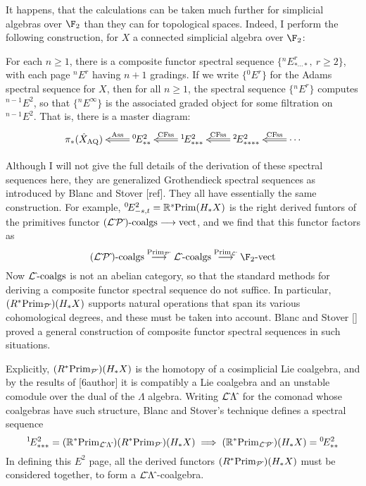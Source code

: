 \documentclass[11pt]{article}
\begin{document}
It happens, that the calculations can be taken much further for simplicial algebras over $\F_2$ than they can for topological spaces. Indeed, I perform the following construction, for $X$ a connected simplicial algebra over $\F_2$:
\begin{thm*}
For each $n\geq1$, there is a composite functor spectral sequence $\{{^{n\!}}E^r_{*\cdots *},\ r\geq2\}$, with each page ${^{n\!}}E^r$ having $n+1$ gradings. If we write $\{{^{0\!}}E^r\}$ for the Adams spectral sequence for $X$, then for all $n\geq1$, the spectral sequence $\{{^{n\!}}E^r\}$ computes ${^{n-1\!}}E^2$, so that $\{{^{n\!}}E^\infty\}$ is the associated graded object for some filtration on ${^{n-1\!}}E^2$. That is, there is a master diagram:
\[\xymatrix@R=4mm{
\pi_{*}(\hat X_\textup{AQ})&%
\ar@{=>}[l]_-{\textup{Ass}}
{^{0\!}}E^2_{**}&%
\ar@{=>}[l]_-{\textup{CFss}}
{^{1\!}}E^2_{***}
&%
{^{2\!}}E^2_{****}
\ar@{=>}[l]_-{\textup{CFss}}&%
\cdots
\ar@{=>}[l]_-{\textup{CFss}}%
}\]
\end{thm*}
Although I will not give the full details of the derivation of these spectral sequences here, they are generalized Grothendieck spectral sequences as introduced by Blanc and Stover [ref]. They all have essentially the same construction. For example, ${^{0\!}}E^2_{-s,t}=\mathbb{R}^s\textup{Prim}(H_*X)$ is the right derived funtors of the primitives functor $(\mathcal{L}{\hat{\,}}\mathcal{P}{\hat{\,}})\textup{-coalgs}\longrightarrow \textup{vect}$, and we find that this functor factors as
\[(\calL{\hat{\,}}\calP{\hat{\,}})\textup{-coalgs}\overset{\textup{Prim}_{\calP{\hat{\,}}}}{\to}
\calL{\hat{\,}}\textup{-coalgs}\overset{\textup{Prim}_{\calL{\hat{\,}}}}{\to}
 \F_2\textup{-vect}\]
Now $\mathcal{L}{\hat{\,}}\textup{-coalgs}$ is not an abelian category, so that the standard methods for deriving a composite functor spectral sequence do not suffice. In particular, $(R^*\textup{Prim}_{\mathcal{P}{\hat{\,}}})(H_*X)$ supports natural operations that span its various cohomological degrees, and these must be taken into account. Blanc and Stover [] proved a general construction of composite functor spectral sequences in such situations.

Explicitly, $(R^*\textup{Prim}_{\mathcal{P}{\hat{\,}}})(H_*X)$ is the homotopy of a cosimplicial Lie coalgebra, and by the results of [6author] it is compatibly a Lie coalgebra and an unstable comodule over the dual of the $\Lambda$ algebra. Writing $\mathcal{L}{\hat{\,}}\Lambda{\hat{\,}}$ for the comonad whose coalgebras have such structure, Blanc and Stover's technique defines a spectral sequence \[{^{1\!}}E^2_{***}= (\mathbb{R}^* \textup{Prim}_{\mathcal{L}{\hat{\,}}\Lambda{\hat{\,}}})(R^*\textup{Prim}_{\mathcal{P}{\hat{\,}}})(H_*X) \implies (\mathbb{R}^* \textup{Prim}_{\mathcal{L}{\hat{\,}}\mathcal{P}{\hat{\,}}})(H_*X)={^{0\!}}E^2_{**}\]
In defining this $E^2$ page, all the derived functors $(R^*\textup{Prim}_{\mathcal{P}{\hat{\,}}})(H_*X)$ must be considered together, to form a $\mathcal{L}{\hat{\,}}\Lambda{\hat{\,}}$-coalgebra.
\end{document}

